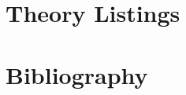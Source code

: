 \appendix

\vfill
\section{Theory Listings}
{
\let\Section\subsection
\let\Subsection\subsubsection
\def\subsection#1{\Subsection*{#1}}
\def\section#1{\Section{#1}\label{ariscat}}

\def\section#1{\Section{#1}\label{syllog1}}

\def\section#1{\Section{#1}\label{syllog2}}

\def\section#1{\Section{#1}\label{modsyllog}}

\def\section#1{\Section{#1}\label{syllmetap}}

\def\section#1{\Section{#1}\label{gccon}}


}  %

\pagebreak

\section*{Bibliography}\label{BIBLIOGRAPHY}

{\def\section*#1{\ignore{#1}}
\raggedright


} %

{
{\small\printindex}}


